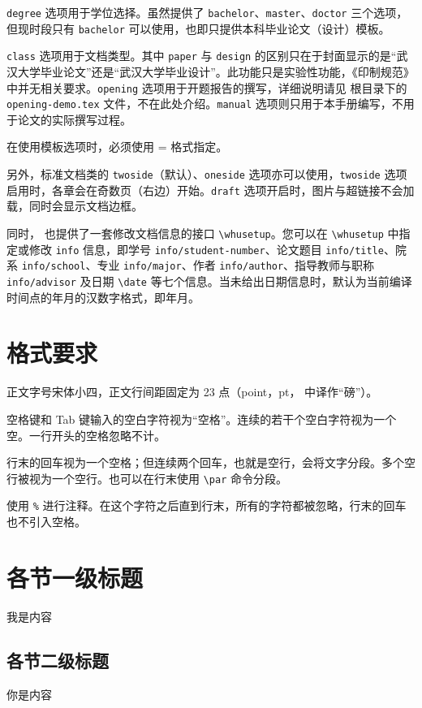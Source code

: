 \verb|degree| 选项用于学位选择。虽然提供了 \verb|bachelor|、\verb|master|、\verb|doctor| 三个选项，但现时段只有 \verb|bachelor| 可以使用，也即只提供本科毕业论文（设计）模板。

\verb|class| 选项用于文档类型。其中 \verb|paper| 与 \verb|design| 的区别只在于封面显示的是“武汉大学毕业论文”还是“武汉大学毕业设计”。此功能只是实验性功能，《印制规范》中并无相关要求。\verb|opening| 选项用于开题报告的撰写，详细说明请见 根目录下的 \verb|opening-demo.tex| 文件，不在此处介绍。\verb|manual| 选项则只用于本手册编写，不用于论文的实际撰写过程。

在使用模板选项时，必须使用  =  格式指定。

另外，标准文档类的 \verb|twoside|（默认）、\verb|oneside| 选项亦可以使用，\verb|twoside| 选项启用时，各章会在奇数页（右边）开始。\verb|draft| 选项开启时，图片与超链接不会加载，同时会显示文档边框。

同时，\WhuThesis{} 也提供了一套修改文档信息的接口 \verb|\whusetup|。您可以在 \verb|\whusetup| 中指定或修改 \verb|info| 信息，即学号 \verb|info/student-number|、论文题目 \verb|info/title|、院系 \verb|info/school|、专业 \verb|info/major|、作者 \verb|info/author|、指导教师与职称 \verb|info/advisor| 及日期 \verb|\date| 等七个信息。当未给出日期信息时，默认为当前编译时间点的年月的汉数字格式，即\zhdigits{\the\year}年\zhnumber{\the\month}月。

\section{格式要求}
正文字号宋体小四，正文行间距固定为 23 点（point，pt， 中译作“磅”）。

空格键和 Tab       键输入的空白字符视为“空格”。连续的若干个空白字符视为一个空。一行开头的空格忽略不计。\par
行末的回车视为一个空格；但连续两个回车，也就是空行，会将文字分段。多个空行被视为一个空行。也可以在行末使用 \verb|\par| 命令分段。



使用 \verb|%| 进行注释。在这个字符之后直到行末，所有的字符都被忽略，行末的回车也不引入空格。%

\section{各节一级标题}
我是内容

\subsection{各节二级标题}
你是内容

